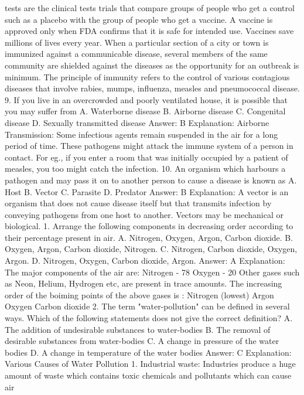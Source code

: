 tests are the clinical tests trials that compare groups of people who
get a control such as a placebo with the group of people who get a
vaccine. A vaccine is approved only when FDA confirms that it is safe
for intended use.
Vaccines save millions of lives every year. When a particular section
of a city or town is immunized against a communicable disease,
several members of the same community are shielded against the
diseases as the opportunity for an outbreak is minimum. The
principle of immunity refers to the control of various contagious
diseases that involve rabies, mumps, influenza, measles and
pneumococcal disease.
9. If you live in an overcrowded and poorly ventilated house, it
is possible that you may suffer from
A. Waterborne disease
B. Airborne disease
C. Congenital disease
D. Sexually transmitted disease
Answer: B
Explanation:
Airborne Transmission: Some infectious agents remain suspended in
the air for a long period of time. These pathogens might attack the
immune system of a person in contact. For eg., if you enter a room
that was initially occupied by a patient of measles, you too might
catch the infection.
10. An organism which harbours a pathogen and may pass it on
to another person to cause a disease is known as
A. Host
B. Vector
C. Parasite
D. Predator
Answer: B
Explanation: A vector is an organism that does not cause disease
itself but that transmits infection by conveying pathogens from one
host to another. Vectors may be mechanical or biological.
1. Arrange the following components in decreasing order
according to their percentage present in air.
A. Nitrogen, Oxygen, Argon, Carbon dioxide.
B. Oxygen, Argon, Carbon dioxide, Nitrogen.
C. Nitrogen, Carbon dioxide, Oxygen, Argon.
D. Nitrogen, Oxygen, Carbon dioxide, Argon.
Answer: A
Explanation: The major components of the air are: Nitrogen - 78%
Oxygen - 20%
Other gases such as Neon, Helium, Hydrogen etc, are present in
trace amounts. The increasing order of the boiming points of the
above gases is : Nitrogen (lowest) Argon Oxygen Carbon dioxide
2. The term "water-pollution" can be defined in several ways.
Which of the following statements does not give the correct
definition?
A. The addition of undesirable substances to water-bodies
B. The removal of desirable substances from water-bodies
C. A change in pressure of the water bodies
D. A change in temperature of the water bodies
Answer: C
Explanation: Various Causes of Water Pollution
1. Industrial waste: Industries produce a huge amount of waste
which contains toxic chemicals and pollutants which can cause air
